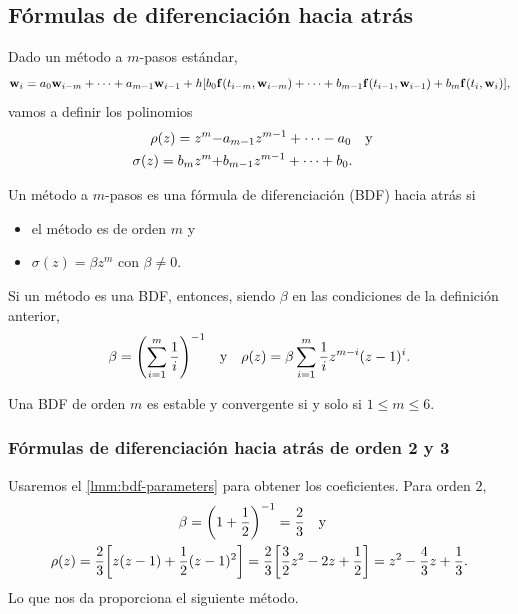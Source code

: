 \subsection{Fórmulas de diferenciación hacia atrás}

Dado un método a $m$-pasos estándar,
\begin{equation*}
    \vb{w}{}_i = a_0\vb{w}{}_{i-m} + \dots + a_{m-1}\vb{w}{}_{i-1} + h\qty[
        b_0\vb{f}{}(t_{i-m}, \vb{w}{}_{i-m}) + \dots + b_{m-1}\vb{f}{}(t_{i-1}, \vb{w}{}_{i-1})
        + b_m\vb{f}{}(t_i, \vb{w}{}_i)
    ],
\end{equation*}
vamos a definir los polinomios
\begin{align*}
    \rho(z) = z^m -& a_{m-1}z^{m-1} + \dots - a_0 \qq{y} \\
    \sigma(z) = b_mz^m +& b_{m-1}z^{m-1} + \dots + b_0.
\end{align*}

\begin{definition}
    Un método a $m$-pasos es una fórmula de diferenciación (BDF) hacia atrás si
    \begin{itemize}
        \item el método es de orden $m$ y
        \item $\sigma(z) = \beta z^m$ con $\beta \ne 0$.
    \end{itemize}
\end{definition}

\begin{lemma}\label{lmm:bdf-parameters}
    Si un método es una BDF, entonces,
    siendo $\beta$ en las condiciones de la definición anterior,
    \begin{equation*}
        \beta = \qty(\sum_{i=1}^m \frac{1}{i})^{-1} \qq{y}
        \rho(z) = \beta\sum_{i=1}^m \frac{1}{i}z^{m-i}(z-1)^i.
    \end{equation*}
\end{lemma}

\begin{theorem}
    Una BDF de orden $m$ es estable y convergente si y solo si $1 \le m \le 6$.
\end{theorem}

\subsubsection{Fórmulas de diferenciación hacia atrás de orden 2 y 3}

Usaremos el \cref{lmm:bdf-parameters} para obtener los coeficientes.
Para orden $2$,
\begin{gather*}
    \beta = \qty(1 + \frac{1}{2})^{-1} = \frac{2}{3} \qq{y} \\
    \rho(z) = \frac{2}{3}\qty[z(z-1) + \frac{1}{2}(z-1)^2] =
    \frac{2}{3}\qty[\frac{3}{2}z^2 - 2z + \frac{1}{2}] =
    z^2 - \frac{4}{3}z + \frac{1}{3}.
\end{gather*}
Lo que nos da proporciona el siguiente método.

